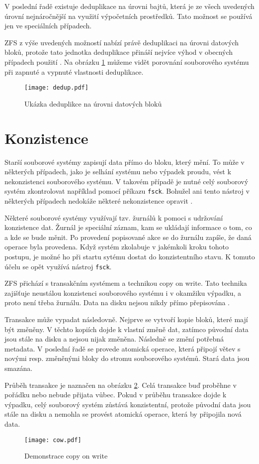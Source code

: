 V poslední řadě existuje deduplikace na úrovni bajtů, která je ze všech uvedených úrovní nejnáročnější na využití výpočetních prostředků. Tato možnost se používá jen ve speciálních případech.

ZFS z výše uvedených možností nabízí právě deduplikaci na úrovni datových bloků, protože tato jednotka deduplikace přináší nejvíce výhod v obecných případech použití \cite{dedup}. Na obrázku \ref{blockdedup} můžeme vidět porovnání souborového systému při zapnuté a vypnuté vlastnosti deduplikace.
\begin{figure}
    \texttt{[image: dedup.pdf]}
    \caption{Ukázka deduplikce na úrovni datových bloků}
    \label{blockdedup}
\end{figure}
\section{Konzistence}
\label{consitence}
Starší souborové systémy zapisují data přímo do bloku, který mění. To může v některých případech, jako je selhání systému nebo výpadek proudu, vést k nekonzistenci souborového systému. V takovém případě je nutné celý souborový systém zkontrolovat například pomocí příkazu \verb|fsck|. Bohužel ani tento nástroj v některých případech nedokáže některé nekonzistence opravit \cite{transaction}.

Některé souborové systémy využívají tzv. žurnálů k pomoci s udržování konzistence dat. Žurnál je speciální záznam, kam se ukládají informace o tom, co a kde se bude měnit. Po provedení popisované akce se do žurnálu zapíše, že daná operace byla provedena. Když systém zkolabuje v jakémkoli kroku tohoto postupu, je možné ho při startu sytému dostat do konzistentního stavu. K tomuto účelu se opět využívá nástroj \verb|fsck|.

ZFS přichází s transakčním systémem a technikou copy on write. Tato technika zajišťuje neustálou konzistenci souborového systému i v okamžiku výpadku, a proto není třeba žurnálu. Data na disku nejsou nikdy přímo přepisována \cite{transaction}.

Transakce může vypadat následovně. Nejprve se vytvoří kopie bloků, které mají být změněny. V těchto kopiích dojde k vlastní změně dat, zatímco původní data jsou stále na disku a nejsou nijak změněna. Následně se změní potřebná metadata. V poslední řadě se provede atomická operace, která připojí větev s novými resp. změněnými bloky do stromu souborového systémů. Stará data jsou smazána.

Průběh transakce je naznačen na obrázku \ref{cow}. Celá transakce buď proběhne v pořádku nebo nebude přijata vůbec. Pokud v průběhu transakce dojde k výpadku, celý souborový systém zůstává konzistentní, protože původní data jsou stále na disku a nemohla se provést atomická operace, která by připojila nová data.
\begin{figure}
    \centering
    \texttt{[image: cow.pdf]}
    \caption{Demonstrace copy on write}
    \label{cow}
\end{figure}
